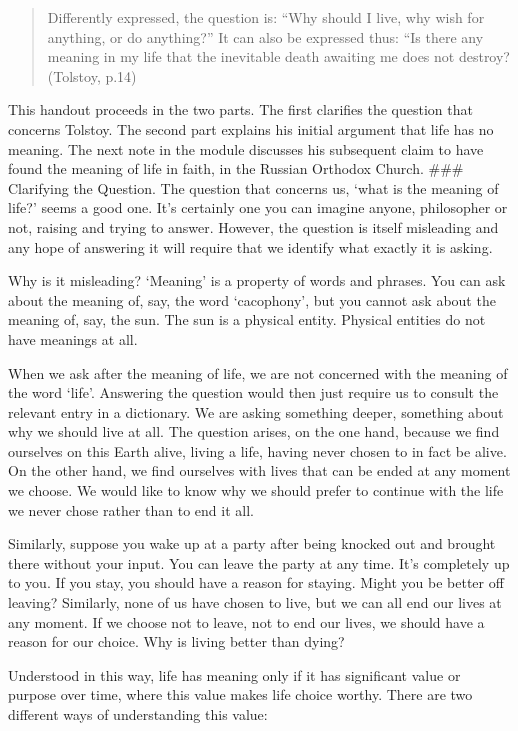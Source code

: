 \documentclass[]{article}
\begin{document}
\begin{quote}
Differently expressed, the question is: ``Why should I live, why wish
for anything, or do anything?'' It can also be expressed thus: ``Is
there any meaning in my life that the inevitable death awaiting me does
not destroy? (Tolstoy, p.14)
\end{quote}

This handout proceeds in the two parts. The first clarifies the question
that concerns Tolstoy. The second part explains his initial argument
that life has no meaning. The next note in the module discusses his
subsequent claim to have found the meaning of life in faith, in the
Russian Orthodox Church. \#\#\# Clarifying the Question. The question
that concerns us, `what is the meaning of life?' seems a good one. It's
certainly one you can imagine anyone, philosopher or not, raising and
trying to answer. However, the question is itself misleading and any
hope of answering it will require that we identify what exactly it is
asking.

Why is it misleading? `Meaning' is a property of words and phrases. You
can ask about the meaning of, say, the word `cacophony', but you cannot
ask about the meaning of, say, the sun. The sun is a physical entity.
Physical entities do not have meanings at all.

When we ask after the meaning of life, we are not concerned with the
meaning of the word `life'. Answering the question would then just
require us to consult the relevant entry in a dictionary. We are asking
something deeper, something about why we should live at all. The
question arises, on the one hand, because we find ourselves on this
Earth alive, living a life, having never chosen to in fact be alive. On
the other hand, we find ourselves with lives that can be ended at any
moment we choose. We would like to know why we should prefer to continue
with the life we never chose rather than to end it all.

Similarly, suppose you wake up at a party after being knocked out and
brought there without your input. You can leave the party at any time.
It's completely up to you. If you stay, you should have a reason for
staying. Might you be better off leaving? Similarly, none of us have
chosen to live, but we can all end our lives at any moment. If we choose
not to leave, not to end our lives, we should have a reason for our
choice. Why is living better than dying?

Understood in this way, life has meaning only if it has significant
value or purpose over time, where this value makes life choice worthy.
There are two different ways of understanding this value:
\end{document}

